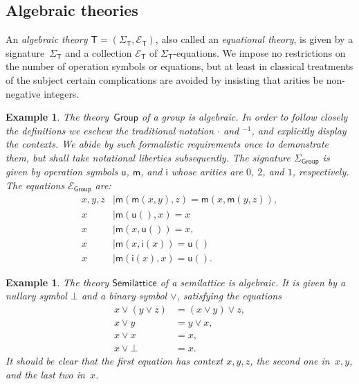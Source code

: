 \documentclass{amsart}
\newcommand{\theory}[1]{\mathsf{#1}} %
\newcommand{\signature}[1]{\Sigma_{\theory{#1}}} %
\newcommand{\equations}[1]{\mathcal{E}_{\theory{#1}}} %
\newtheorem{example}[definition]{Example}
\begin{document}
\subsection{Algebraic theories}
\label{sec:algebraic-theories-1}

An \emph{algebraic theory $\theory{T} = (\signature{T}, \equations{T})$}, also
called an \emph{equational theory}, is given by a signature~$\signature{T}$ and
a collection $\equations{T}$ of $\signature{T}$-equations.
%
We impose no restrictions on the number of operation symbols or equations, but at least in
classical treatments of the subject certain complications are avoided by insisting that
arities be non-negative integers.

\begin{example}
  \label{ex:theory-group}
  The theory~$\theory{Group}$ of a group is algebraic. In order to follow closely the
  definitions we eschew the traditional notation $\cdot$ and ${}^{-1}$, and explicitly
  display the contexts. We abide by such formalistic requirements once to demonstrate
  them, but shall take notational liberties subsequently.
  The signature $\signature{Group}$ is given by operation symbols $\mathsf{u}$,
  $\mathsf{m}$, and $\mathsf{i}$ whose arities are $0$, $2$, and $1$, respectively. The
  equations $\equations{Group}$ are:
  \begin{align*}
    x, y, z &\mid \mathsf{m}(\mathsf{m}(x, y), z) = \mathsf{m}(x, \mathsf{m}(y, z)),\\
    x &\mid \mathsf{m}(\mathsf{u}(), x) = x \\
    x &\mid \mathsf{m}(x, \mathsf{u}()) = x,\\
    x &\mid \mathsf{m}(x, \mathsf{i}(x)) = \mathsf{u}()\\
    x &\mid \mathsf{m}(\mathsf{i}(x), x) = \mathsf{u}().
  \end{align*}
\end{example}

\begin{example}
  \label{ex:semi-lattice}
  The theory $\theory{Semilattice}$ of a semilattice is algebraic. It is given by a
  nullary symbol $\bot$ and a binary symbol $\vee$, satisfying the equations
  \begin{align*}
    x \vee (y \vee z) &= (x \vee y) \vee z,\\
    x \vee y &= y \vee x,\\
    x \vee x &= x,\\
    x \vee \bot &= x.
  \end{align*}
  It should be clear that the first equation has context $x, y, z$, the second one
  in~$x, y$, and the last two in~$x$.
\end{example}
\end{document}
